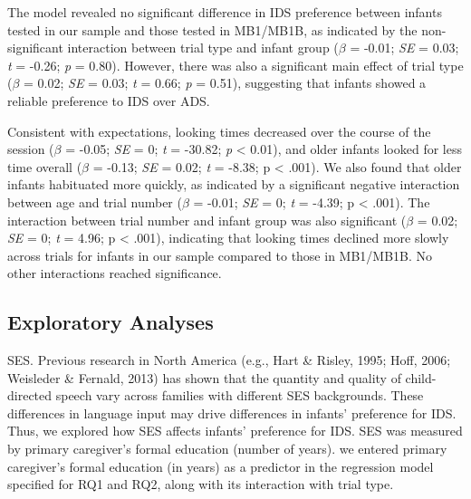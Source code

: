 \documentclass[
  ,man,floatsintext]{apa6}
\begin{document}
The model revealed no significant difference in IDS preference between infants tested in our sample and those tested in MB1/MB1B, as indicated by the non-significant interaction between trial type and infant group (\emph{\(\beta\)} = -0.01; \emph{SE} = 0.03; \emph{t} = -0.26; \emph{p} = 0.80). However, there was also a significant main effect of trial type (\emph{\(\beta\)} = 0.02; \emph{SE} = 0.03; \emph{t} = 0.66; \emph{p} = 0.51), suggesting that infants showed a reliable preference to IDS over ADS.

Consistent with expectations, looking times decreased over the course of the session (\emph{\(\beta\)} = -0.05; \emph{SE} = 0; \emph{t} = -30.82; \emph{p} \textless{} 0.01), and older infants looked for less time overall (\emph{\(\beta\)} = -0.13; \emph{SE} = 0.02; \emph{t} = -8.38; p \textless{} .001). We also found that older infants habituated more quickly, as indicated by a significant negative interaction between age and trial number (\emph{\(\beta\)} = -0.01; \emph{SE} = 0; \emph{t} = -4.39; p \textless{} .001). The interaction between trial number and infant group was also significant (\emph{\(\beta\)} = 0.02; \emph{SE} = 0; \emph{t} = 4.96; p \textless{} .001), indicating that looking times declined more slowly across trials for infants in our sample compared to those in MB1/MB1B. No other interactions reached significance.

\hypertarget{exploratory-analyses}{%
\subsection{Exploratory Analyses}\label{exploratory-analyses}}

SES. Previous research in North America (e.g., Hart \& Risley, 1995; Hoff, 2006; Weisleder \& Fernald, 2013) has shown that the quantity and quality of child-directed speech vary across families with different SES backgrounds. These differences in language input may drive differences in infants' preference for IDS. Thus, we explored how SES affects infants' preference for IDS. SES was measured by primary caregiver's formal education (number of years). we entered primary caregiver's formal education (in years) as a predictor in the regression model specified for RQ1 and RQ2, along with its interaction with trial type.
\end{document}
